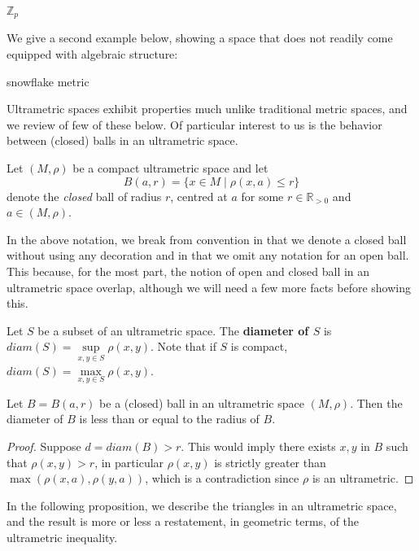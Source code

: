 \begin{example} $\mathbb{Z}_p$ \end{example}

We give a second example below, showing a space that does not readily come equipped with algebraic structure:

\begin{example} snowflake metric \end{example}

Ultrametric spaces exhibit properties much unlike traditional metric spaces, and we review of few of these below. Of particular interest to us is the behavior between (closed) balls in an ultrametric space.\\

\begin{notation*}
	Let $(M, \rho)$ be a compact ultrametric space and let \[B(a, r)=\{x \in M \mid \rho(x,a) \leq r\}\] denote the \textit{closed} ball of radius $r$, centred at $a$ for some $r \in \mathbb{R}_{> 0}$ and $a \in (M,\rho)$.
\end{notation*} 
In the above notation, we break from  convention in that we denote a closed ball without using any decoration and in that we omit any notation for an open ball. This because, for the most part, the notion of open and closed ball in an ultrametric space overlap, although we will need a few more facts before showing this.\\

\begin{definition}
Let $S$ be a subset of an ultrametric space. The \textbf{diameter of $S$} is $diam(S) = \sup\limits_{x,y\in S}\rho(x,y)$. Note that if $S$ is compact, $diam(S) = \max\limits_{x,y\in S}\rho(x,y)$.
\end{definition}

\begin{proposition}
	Let $B=B(a, r)$ be a (closed) ball in an ultrametric space $(M,\rho)$. Then the diameter of $B$ is less than or equal to the radius of $B$.    
\end{proposition}

\begin{proof}
Suppose $d = diam(B) > r$. This would imply there exists $x,y$ in $B$ such that $\rho(x,y) > r$, in particular $\rho(x,y)$ is strictly greater than $\max(\rho(x,a), \rho(y,a))$, which is a contradiction since $\rho$ is an ultrametric.
\end{proof}

In the following proposition, we describe the triangles in an ultrametric space, and the result is more or less a restatement, in geometric terms, of the ultrametric inequality.\\

